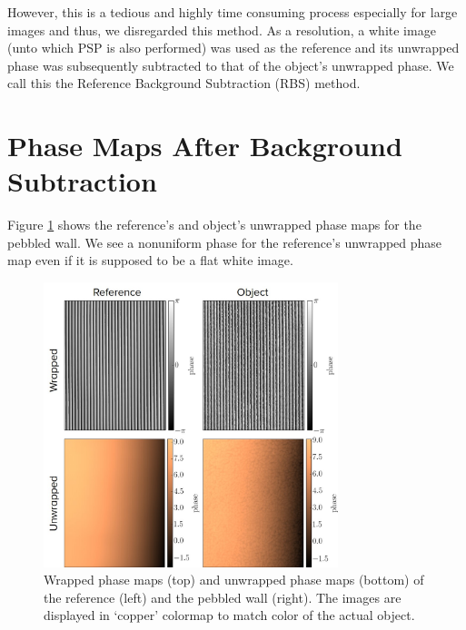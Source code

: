However, this is a tedious and highly time consuming process especially for large images and thus, we disregarded this method. As a resolution, a white image (unto which PSP is also performed) was used as the reference and its unwrapped phase was subsequently subtracted to that of the object's unwrapped phase. We call this the Reference Background Subtraction (RBS) method.

\section{Phase Maps After Background Subtraction} 
Figure \ref{fig:stone} shows the reference's and object's unwrapped phase maps for the pebbled wall. 
We see a nonuniform phase for the reference's unwrapped phase map even if it is supposed to be a flat white image.

\captionsetup[figure]{width=5.5in}
\begin{figure}[h!]
	\centering
	\includegraphics[width=0.765\textwidth]{figures/pebble.jpg}
	\caption[Wrapped and unwrapped phase maps of the reference and the pebbled wall]{Wrapped phase maps (top) and unwrapped phase maps (bottom) of the reference (left) and the pebbled wall (right). The images are displayed in `copper' colormap to match color of the actual object.}
	\label{fig:stone}
\end{figure}

